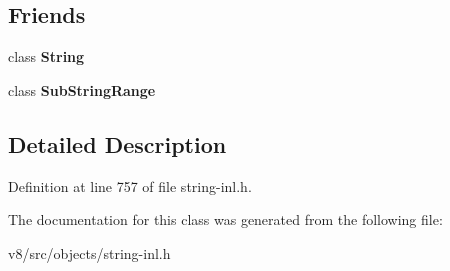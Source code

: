 \subsection*{Friends}
\begin{DoxyCompactItemize}
\item 
\mbox{\label{classv8_1_1internal_1_1SubStringRange_1_1iterator_a7fb804f7dc96dd9f705c84095f37f1ca}} 
class {\bfseries String}
\item 
\mbox{\label{classv8_1_1internal_1_1SubStringRange_1_1iterator_adc95af7425f40cc3fa40497cbf8e0c32}} 
class {\bfseries Sub\+String\+Range}
\end{DoxyCompactItemize}


\subsection{Detailed Description}


Definition at line 757 of file string-\/inl.\+h.



The documentation for this class was generated from the following file\+:\begin{DoxyCompactItemize}
\item 
v8/src/objects/string-\/inl.\+h\end{DoxyCompactItemize}
